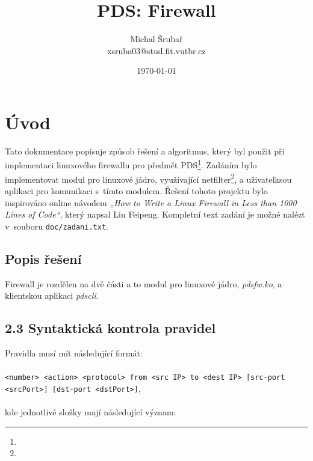 \documentclass[10pt,a4paper,notitlepage]{article}
\author{Michal Šrubař\\xsruba03@stud.fit.vutbr.cz}
\date{\today}
\title{PDS: Firewall}
\newcommand{\myUrl}[1]{{\color{blue}{#1}}}
\begin{document}
\maketitle

\section{Úvod} \label{sec:hladka_sazba}
Tato dokumentace popisuje způsob řešení a algoritmus, který byl použit při
implementaci linuxového firewallu pro předmět
PDS\footnote{\myUrl{http://www.fit.vutbr.cz/study/course-l.php.cs?id=6391}}. Zadáním
bylo implementovat modul pro linuxové jádro, využívající
netfilter\footnote{\myUrl{http://www.netfilter.org/}}, a uživatelksou aplikaci pro
komunikaci s~tímto modulem. Řešení tohoto projektu bylo inspirováno online
návodem \textit{„How to Write a Linux Firewall in Less than 1000 Lines of
Code“}\cite{one},
který napsal Liu Feipeng. Kompletní text zadání je možné nalézt v~souboru
\texttt{doc/zadani.txt}.

\subsection{Popis řešení}
Firewall je rozdělen na dvě části a to modul pro linuxové jádro,
\textit{pdsfw.ko}, a klientskou aplikaci \textit{pdscli}. 

\subsection{2.3 Syntaktická kontrola pravidel}
Pravidla musí mít následující formát: 
\\
\\
\texttt{<number> <action> <protocol> from <src IP> to <dest IP> [src-port <srcPort>] [dst-port <dstPort>]}, 
\\
\\
kde jednotlivé složky mají následující význam:
\end{document}

